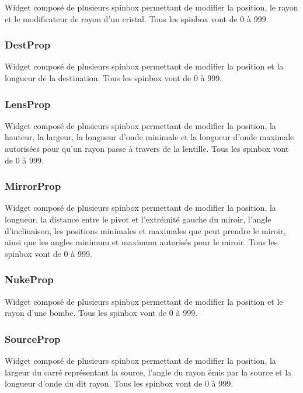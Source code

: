 \documentclass[]{report}
\begin{document}
Widget composé de plusieurs spinbox permettant de modifier la position, le rayon et le modificateur de rayon
d'un cristal. Tous les spinbox vont de 0 à 999.

\subsubsection{\label{DestProp}DestProp}

Widget composé de plusieurs spinbox permettant de modifier la position et la longueur de la destination. Tous les spinbox vont de 0 à 999.

\subsubsection{\label{LensProp}LensProp}

Widget composé de plusieurs spinbox permettant de modifier la position, la hauteur, la largeur, 
la longueur d’onde minimale et la longueur d’onde maximale autorisées pour qu’un rayon passe à travers de la lentille.
Tous les spinbox vont de 0 à 999.

\subsubsection{\label{MirrorProp}MirrorProp}

Widget composé de plusieurs spinbox permettant de modifier la position, la longueur, la distance entre le pivot 
et l’extrémité gauche du miroir, l’angle d’inclinaison, les positions minimales et maximales que peut prendre le miroir, 
ainsi que les angles minimum et maximum autorisés pour le miroir. Tous les spinbox vont de 0 à 999.

\subsubsection{\label{NukeProp}NukeProp}

Widget composé de plusieurs spinbox permettant de modifier la position et le rayon d’une bombe. Tous les spinbox vont de 0 à 999.

\subsubsection{\label{SourceProp}SourceProp}

Widget composé de plusieurs spinbox permettant de modifier la position, la largeur du carré représentant la source, 
l’angle du rayon émis par la source et la longueur d’onde du dit rayon. Tous les spinbox vont de 0 à 999.
\end{document}
